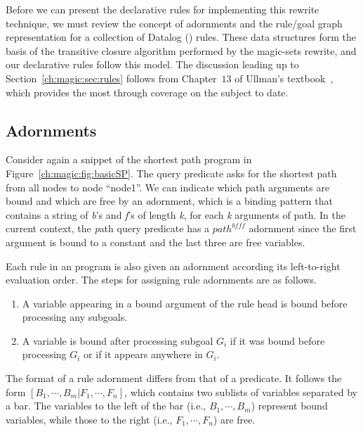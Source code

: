 Before we can present the declarative rules for implementing this rewrite
technique, we must review the concept of adornments and the rule/goal graph
representation for a collection of Datalog (\OVERLOG) rules.  These data
structures form the basis of the transitive closure algorithm performed by the
magic-sets rewrite, and our declarative rules follow this model.  The
discussion leading up to Section~\ref{ch:magic:sec:rules} follows from
Chapter~$13$ of Ullman's textbook~, which provides the most
through coverage on the subject to date.


\subsection{Adornments}

Consider again a snippet of the shortest path program in
Figure~\ref{ch:magic:fig:basicSP}.  The query predicate  asks for the shortest path from all nodes to node ``node1''.  We can
indicate which path arguments are bound and which are free by an {\emph
adornment}, which is a binding pattern that contains a string of {\emph b's}
and {\emph f's} of length {\emph k}, for each {\emph k} arguments of path.  In
the current context, the {\emph path} query predicate has a $path^{bfff}$
adornment since the first argument is bound to a constant and the last three
are free variables.

Each rule in an \OVERLOG program is also given an adornment according its
left-to-right evaluation order.  The steps for assigning rule adornments are as
follows.
\begin{enumerate}
    \ssp
    \item A variable appearing in a bound argument of the rule head is bound before processing any subgoals.
    \item A variable is bound after processing subgoal $G_i$ if it was bound 
          before processing $G_i$ or if it appears anywhere in $G_i$.
\end{enumerate}
The format of a rule adornment differs from that of a predicate.  It follows the form
$[B_1,\cdots,B_m|F_1,\cdots,F_n]$, which contains two sublists of variables
separated by a bar.  The variables to the left of the bar (i.e.,
$B_1,\cdots,B_m$) represent bound variables, while those to the right (i.e.,
$F_1,\cdots,F_n$) are free. 

